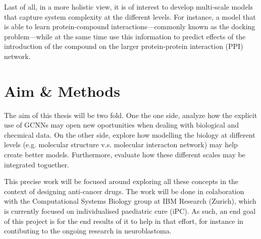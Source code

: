 \documentclass{article}
\begin{document}
Last of all, in a more holistic view, it is of interest to develop multi-scale models
that capture system complexity at the different levels. For instance, a model that is
able to learn protein-compound interactions---commonly known as the docking
problem---while at the same time use this information to predict effects of the
introduction of the compound on the larger protein-protein interaction (PPI)
network\cite{Sun2019}.

    \section*{Aim \& Methods}

The aim of this thesis will be two fold. One the one side, analyze how the explicit use
of GCNNs may open new oportunities when dealing with biological and checmical data. On
the other side, explore how modelling the biology at different levels (e.g. molecular
structure v.s. molecular interacton network) may help 
create better models. Furthermore, evaluate how these different scales may be integrated
toguether.

This precise work will be focused around exploring all these concepts in the context of
designing anti-cancer drugs. The work will be done in colaboration with the
Computational Systems Biology group at IBM Research (Zurich), which is currently focused
on individualised paediatric cure (iPC). As such, an end goal of this project is for the
end results of it to help in that effort, for instance in contibuting to the ongoing
research in neuroblastoma.
\end{document}
